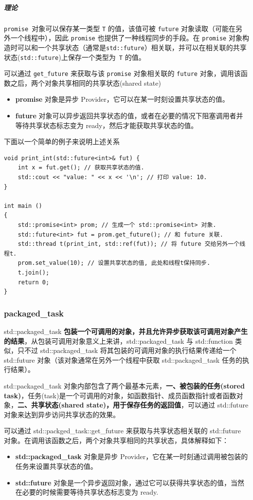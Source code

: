 \documentclass[UTF8,a4paper,12pt]{ctexbook}
\begin{document}
			\subparagraph{理论}
			\verb|promise |对象可以保存某一类型 \verb|T| 的值，该值可被 \verb|future| 对象读取（可能在另外一个线程中），因此 \verb|promise| 也提供了一种线程同步的手段。在 \verb|promise| 对象构造时可以和一个共享状态（通常是\verb|std::future|）相关联，并可以在相关联的共享状态(\verb|std::future|)上保存一个类型为\verb| T| 的值。
			
			可以通过 \verb|get_future| 来获取与该 \verb|promise| 对象相关联的 \verb|future| 对象，调用该函数之后，两个对象共享相同的共享状态(shared state)
				\begin{itemize}
					\item \textbf{promise} 对象是异步 Provider，它可以在某一时刻设置共享状态的值。
					\item \textbf{future} 对象可以异步返回共享状态的值，或者在必要的情况下阻塞调用者并等待共享状态标志变为 ready，然后才能获取共享状态的值。
				\end{itemize}
			
			下面以一个简单的例子来说明上述关系
				\begin{lstlisting}
void print_int(std::future<int>& fut) {
	int x = fut.get(); // 获取共享状态的值.
	std::cout << "value: " << x << '\n'; // 打印 value: 10.
}

int main ()
{
	std::promise<int> prom; // 生成一个 std::promise<int> 对象.
	std::future<int> fut = prom.get_future(); // 和 future 关联.
	std::thread t(print_int, std::ref(fut)); // 将 future 交给另外一个线程t.
	prom.set_value(10); // 设置共享状态的值, 此处和线程t保持同步.
	t.join();
	return 0;
}					
				\end{lstlisting}
			
		\subsubsection{packaged\_task}
			std::packaged\_task \textbf{包装一个可调用的对象，并且允许异步获取该可调用对象产生的结果}，从包装可调用对象意义上来讲，std::packaged\_task 与 std::function 类似，只不过 std::packaged\_task 将其包装的可调用对象的执行结果传递给一个 std::future 对象（该对象通常在另外一个线程中获取 std::packaged\_task 任务的执行结果）。
			
			std::packaged\_task 对象内部包含了两个最基本元素，\textbf{一、被包装的任务(stored task)}，任务(task)是一个可调用的对象，如函数指针、成员函数指针或者函数对象，\textbf{二、共享状态(shared state)，用于保存任务的返回值}，可以通过 std::future 对象来达到异步访问共享状态的效果。
			
			可以通过 std::packged\_task::get\_future 来获取与共享状态相关联的 std::future 对象。在调用该函数之后，两个对象共享相同的共享状态，具体解释如下：
			\begin{itemize}
				\item \textbf{std::packaged\_task} 对象是异步 Provider，它在某一时刻通过调用被包装的任务来设置共享状态的值。
				\item \textbf{std::future} 对象是一个异步返回对象，通过它可以获得共享状态的值，当然在必要的时候需要等待共享状态标志变为 ready.
			\end{itemize}
	
\end{document}
